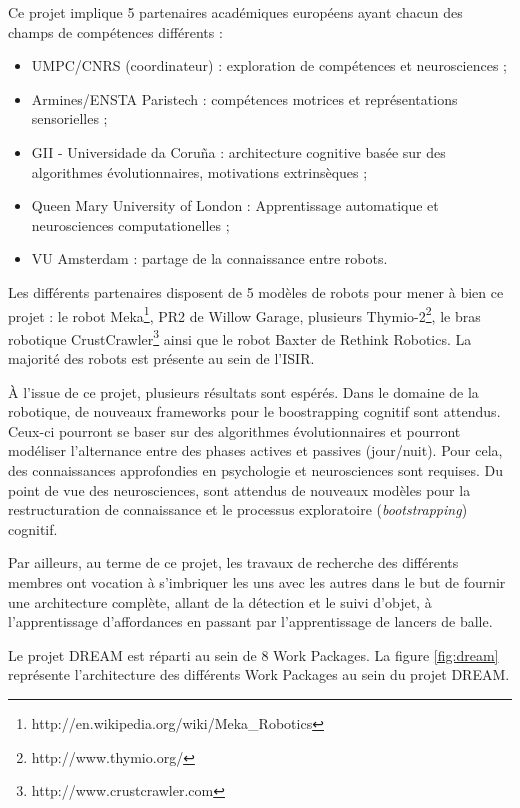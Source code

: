 \documentclass{llncs}
\begin{document}
Ce projet implique 5 partenaires académiques européens ayant chacun des champs de compétences différents : 

\begin{itemize}
  \item UMPC/CNRS (coordinateur) : exploration de compétences et neurosciences ;
  \item Armines/ENSTA Paristech : compétences motrices et représentations sensorielles ;
  \item GII - Universidade da Coruña :  architecture cognitive basée sur des algorithmes évolutionnaires, motivations extrinsèques ;
  \item Queen Mary University of London : Apprentissage automatique et neurosciences computationelles ;
  \item VU Amsterdam : partage de la connaissance entre robots.
\end{itemize}

Les différents partenaires disposent de 5 modèles de robots pour mener à bien ce projet : le robot Meka\footnote{http://en.wikipedia.org/wiki/Meka\_Robotics}, PR2 de Willow Garage, plusieurs Thymio-2\footnote{http://www.thymio.org/}, le bras robotique CrustCrawler\footnote{http://www.crustcrawler.com} ainsi que le robot Baxter de Rethink Robotics. La majorité des robots est présente au sein de l'ISIR.

À l'issue de ce projet, plusieurs résultats sont espérés.
Dans le domaine de la robotique, de nouveaux frameworks pour le boostrapping cognitif sont attendus.
Ceux-ci pourront se baser sur des algorithmes évolutionnaires et pourront modéliser l'alternance entre des phases actives et passives (jour/nuit).
Pour cela, des connaissances approfondies en psychologie et neurosciences sont requises.
Du point de vue des neurosciences, sont attendus de nouveaux modèles pour la restructuration de connaissance et le processus exploratoire (\textit{bootstrapping}) cognitif.

Par ailleurs, au terme de ce projet, les travaux de recherche des différents membres ont vocation à s'imbriquer les uns avec les autres dans le but de fournir une architecture complète, allant de la détection et le suivi d'objet, à l'apprentissage d'affordances en passant par l'apprentissage de lancers de balle.

Le projet DREAM est réparti au sein de 8 Work Packages.
La figure \ref{fig:dream} représente l'architecture des différents Work Packages au sein du projet DREAM.
\end{document}
